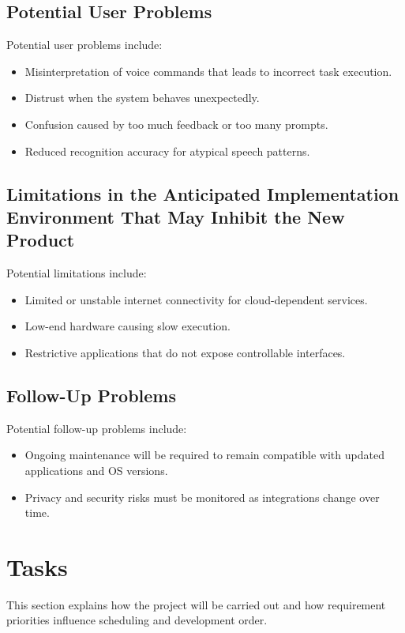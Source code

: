 \documentclass[12pt]{article}
\begin{document}
\subsection{Potential User Problems}
Potential user problems include:
\begin{itemize}
  \item Misinterpretation of voice commands that leads to incorrect
  task execution.
  \item Distrust when the system behaves unexpectedly.
  \item Confusion caused by too much feedback or too many prompts.
  \item Reduced recognition accuracy for atypical speech patterns.
\end{itemize}

\subsection{Limitations in the Anticipated Implementation Environment
That May Inhibit the New Product}
Potential limitations include:
\begin{itemize}
  \item Limited or unstable internet connectivity for cloud-dependent
  services.
  \item Low-end hardware causing slow execution.
  \item Restrictive applications that do not expose controllable
  interfaces.
\end{itemize}

\subsection{Follow-Up Problems}
Potential follow-up problems include:
\begin{itemize}
  \item Ongoing maintenance will be required to remain compatible with
  updated applications and OS versions.
  \item Privacy and security risks must be monitored as integrations
  change over time.
\end{itemize}

\section{Tasks}
This section explains how the project will be carried out and how
requirement priorities influence scheduling and development order.
\end{document}
